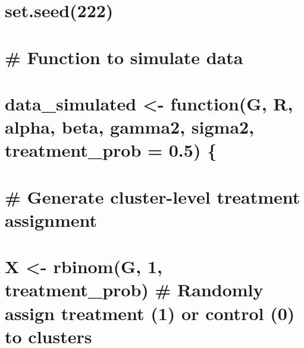 \documentclass[
]{article}
\begin{document}
\hypertarget{section}{%
\section{}\label{section}}

\hypertarget{section-1}{%
\section{}\label{section-1}}

\hypertarget{section-2}{%
\section{}\label{section-2}}

\hypertarget{set.seed222}{%
\section{set.seed(222)}\label{set.seed222}}

\hypertarget{section-3}{%
\section{}\label{section-3}}

\hypertarget{function-to-simulate-data}{%
\section{\# Function to simulate data}\label{function-to-simulate-data}}

\hypertarget{data_simulated---functiong-r-alpha-beta-gamma2-sigma2-treatment_prob-0.5}{%
\section{data\_simulated \textless- function(G, R, alpha, beta, gamma2,
sigma2, treatment\_prob = 0.5)
\{}\label{data_simulated---functiong-r-alpha-beta-gamma2-sigma2-treatment_prob-0.5}}

\hypertarget{generate-cluster-level-treatment-assignment}{%
\section{\# Generate cluster-level treatment
assignment}\label{generate-cluster-level-treatment-assignment}}

\hypertarget{x---rbinomg-1-treatment_prob-randomly-assign-treatment-1-or-control-0-to-clusters}{%
\section{X \textless- rbinom(G, 1, treatment\_prob) \# Randomly assign
treatment (1) or control (0) to
clusters}\label{x---rbinomg-1-treatment_prob-randomly-assign-treatment-1-or-control-0-to-clusters}}
\end{document}
